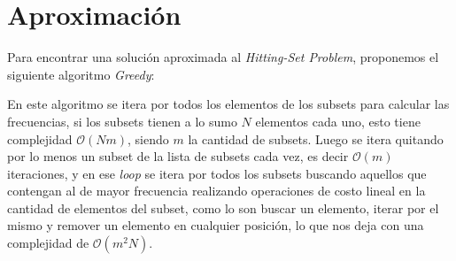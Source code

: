 \section{Aproximaci\'on}

Para encontrar una soluci\'on aproximada al \textit{Hitting-Set Problem},
proponemos el siguiente algoritmo \textit{Greedy}:



En este algoritmo se itera por todos los elementos de los subsets para calcular
las frecuencias, si los subsets tienen a lo sumo $N$ elementos cada uno, esto
tiene complejidad $\mathcal{O}(Nm)$, siendo $m$ la cantidad de subsets. Luego
se itera quitando por lo menos un subset de la lista de subsets cada vez, es
decir $\mathcal{O}(m)$ iteraciones, y en ese \textit{loop} se itera por todos
los subsets buscando aquellos que contengan al de mayor frecuencia realizando
operaciones de costo lineal en la cantidad de elementos del subset, como lo son
buscar un elemento, iterar por el mismo y remover un elemento en cualquier
posici\'on, lo que nos deja con una complejidad de $\mathcal{O}(m^2N)$.
